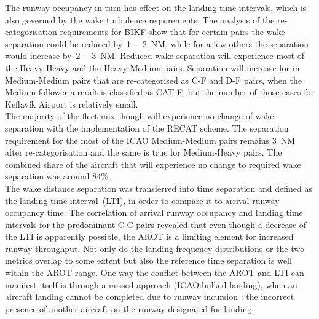 The runway occupancy in turn has effect on the landing time intervals, which is also governed by the wake turbulence requirements.
The analysis of the re-categorisation requirements for BIKF show that for certain pairs the wake separation could be reduced by~1~-~2~NM, while for a few others the separation would increase by~2~-~3~NM. Reduced wake separation will experience most of the Heavy-Heavy and the Heavy-Medium pairs. Separation will increase for in Medium-Medium pairs that are re-categorised as C-F and D-F pairs, when the Medium follower aircraft is classified as CAT-F, but the number of those cases for Keflavík Airport is relatively small.\\
The majority of the fleet mix though will experience no change of wake separation with the implementation of the RECAT scheme. The separation requirement for the most of the ICAO Medium-Medium pairs remains 3~NM after re-categorisation and the same is true for Medium-Heavy pairs. The combined share of the aircraft that will experience no change to required wake separation was around 84\%. \\
The wake distance separation was transferred into time separation and defined as the landing time interval~(LTI), in order to compare it to arrival runway occupancy time.
The correlation of arrival runway occupancy and landing time intervals for the predominant C-C pairs revealed that even though a decrease of the LTI is apparently possible, the AROT is a limiting element for increased runway throughput. Not only do the landing frequency distributions or the two metrics overlap to some extent but also the reference time separation is well within the AROT range. One way the conflict between the AROT and LTI can manifest itself is through a missed approach (ICAO:bulked landing), when an aircraft landing cannot be completed due to runway incursion \cite{doc44444}: the incorrect presence of another aircraft on the runway designated for landing.


